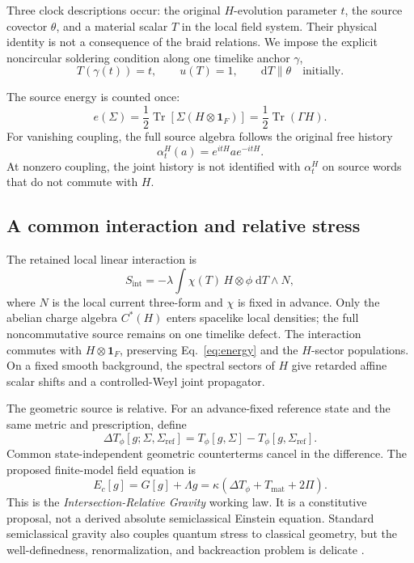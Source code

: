 \documentclass[11pt]{article}
\theoremstyle{definition}
\theoremstyle{remark}
\newcommand{\Tr}{\operatorname{Tr}}
\newcommand{\id}{\mathbf{1}}
\newcommand{\dd}{\mathrm{d}}
\begin{document}
Three clock descriptions occur: the original $H$-evolution parameter $t$, the source covector $\theta$, and a material scalar $T$ in the local field system. Their physical identity is not a consequence of the braid relations. We impose the explicit noncircular soldering condition along one timelike anchor $\gamma$,
\begin{equation}\label{eq:clock}
  T(\gamma(t))=t,\qquad u(T)=1,\qquad \dd T\parallel\theta\quad\text{initially}.
\end{equation}

The source energy is counted once:
\begin{equation}\label{eq:energy}
  e(\Sigma)=\frac12\Tr\!\left[\Sigma(H\otimes\id_F)\right]
  =\frac12\Tr(\Gamma H).
\end{equation}
For vanishing coupling, the full source algebra follows the original free history
\begin{equation}
  \alpha_t^H(a)=e^{itH}a e^{-itH}.
\end{equation}
At nonzero coupling, the joint history is not identified with $\alpha_t^H$ on source words that do not commute with $H$.

\subsection{A common interaction and relative stress}

The retained local linear interaction is
\begin{equation}\label{eq:interaction}
  S_{\mathrm{int}}=-\lambda\int \chi(T)\,H\otimes\phi\;\dd T\wedge N,
\end{equation}
where $N$ is the local current three-form and $\chi$ is fixed in advance. Only the abelian charge algebra $C^*(H)$ enters spacelike local densities; the full noncommutative source remains on one timelike defect. The interaction commutes with $H\otimes\id_F$, preserving Eq.~\eqref{eq:energy} and the $H$-sector populations. On a fixed smooth background, the spectral sectors of $H$ give retarded affine scalar shifts and a controlled-Weyl joint propagator.

The geometric source is relative. For an advance-fixed reference state and the same metric and prescription, define
\begin{equation}
  \Delta T_\phi[g;\Sigma,\Sigma_{\mathrm{ref}}]
  =T_\phi[g,\Sigma]-T_\phi[g,\Sigma_{\mathrm{ref}}].
\end{equation}
Common state-independent geometric counterterms cancel in the difference. The proposed finite-model field equation is
\begin{equation}\label{eq:gravity}
  E_c[g]=G[g]+\Lambda g
  =\kappa\left(\Delta T_\phi+T_{\mathrm{mat}}+2\Pi\right).
\end{equation}
This is the \emph{Intersection-Relative Gravity} working law. It is a constitutive proposal, not a derived absolute semiclassical Einstein equation. Standard semiclassical gravity also couples quantum stress to classical geometry, but the well-definedness, renormalization, and backreaction problem is delicate \cite{hollandswald2001,pinamontisiemssen2021,meda2026}.
\end{document}
